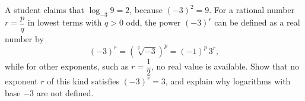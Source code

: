 A student claims that $\log_{-3}9=2$, because $(-3)^2=9$. For a rational number $r=\dfrac pq$ in lowest terms with $q>0$ odd, the power $(-3)^r$ can be defined as a real number by
\[(-3)^r=\left(\sqrt[q]{-3}\right)^p=(-1)^p\,3^r,\]
while for other exponents, such as $r=\dfrac12$, no real value is available. Show that no exponent $r$ of this kind satisfies $(-3)^r=3$, and explain why logarithms with base $-3$ are not defined.
